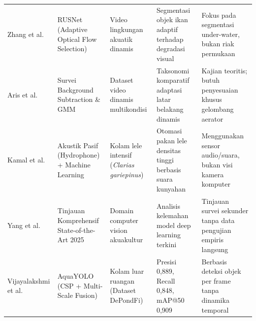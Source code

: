 \begin{small}
\begin{longtable}{p{2.6cm} p{3.2cm} p{2.8cm} p{3.4cm} p{2.6cm}}
{Zhang et al.~\cite{Zhang2024}} & RUSNet (Adaptive Optical Flow Selection) & Video lingkungan akuatik dinamis & Segmentasi objek ikan adaptif terhadap degradasi visual & Fokus pada segmentasi under-water, bukan riak permukaan \\
\addlinespace

{Aris et al.~\cite{Aris2023}} & Survei Background Subtraction \& GMM & Dataset video dinamis multikondisi & Taksonomi komparatif adaptasi latar belakang dinamis & Kajian teoritis; butuh penyesuaian khusus gelombang aerator \\
\addlinespace

{Kamal et al.~\cite{Kamal2025}} & Akustik Pasif (Hydrophone) + Machine Learning & Kolam lele intensif (\textit{Clarias gariepinus}) & Otomasi pakan lele densitas tinggi berbasis suara kunyahan & Menggunakan sensor audio/suara, bukan visi kamera komputer \\
\addlinespace

{Yang et al.~\cite{Yang2025}} & Tinjauan Komprehensif State-of-the-Art 2025 & Domain computer vision akuakultur & Analisis kelemahan model deep learning terkini & Tinjauan survei sekunder tanpa data pengujian empiris langsung \\
\addlinespace

{Vijayalakshmi et al.~\cite{Vijayalakshmi2025}} & AquaYOLO (CSP + Multi-Scale Fusion) & Kolam luar ruangan (Dataset DePondFi) & Presisi 0,889, Recall 0,848, mAP@50 0,909 & Berbasis deteksi objek per frame tanpa dinamika temporal \\

\end{longtable}
\end{small}
